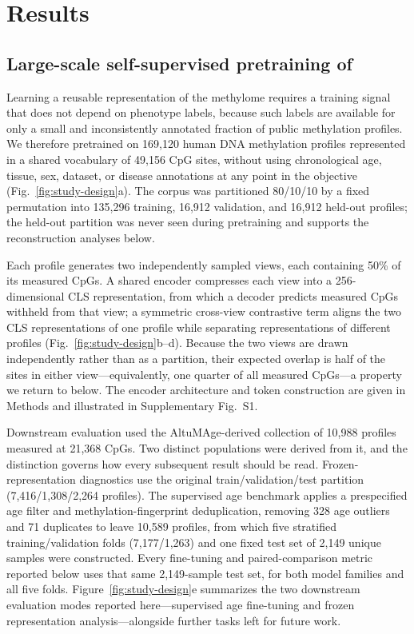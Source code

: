 \section{Results}

\subsection{Large-scale self-supervised pretraining of \method{}}

Learning a reusable representation of the methylome requires a training signal that does not
depend on phenotype labels, because such labels are available for only a small and
inconsistently annotated fraction of public methylation profiles. We therefore pretrained
\method{} on 169,120 human DNA methylation profiles represented in a shared vocabulary of
49,156 CpG sites, without using chronological age, tissue, sex, dataset, or disease
annotations at any point in the objective (Fig.~\ref{fig:study-design}a). The corpus was
partitioned 80/10/10 by a fixed
permutation into 135,296 training, 16,912 validation, and 16,912 held-out profiles; the
held-out partition was never seen during pretraining and supports the reconstruction analyses
below.

Each profile generates two independently sampled views, each containing 50\% of its measured
CpGs. A shared encoder compresses each view into a 256-dimensional CLS representation, from
which a decoder predicts measured CpGs withheld from that view; a symmetric cross-view
contrastive term aligns the two CLS representations of one profile while separating
representations of different profiles (Fig.~\ref{fig:study-design}b--d). Because the two views are
drawn independently rather than as a partition, their expected overlap is half of the sites in
either view---equivalently, one quarter of all measured CpGs---a property we return to below.
The encoder architecture and token construction
are given in Methods and illustrated in Supplementary Fig.~S1.

Downstream evaluation used the AltuMAge-derived collection of 10,988 profiles measured at
21,368 CpGs. Two distinct populations were derived from it, and the distinction governs how
every subsequent result should be read. Frozen-representation diagnostics use the original
train/validation/test partition (7,416/1,308/2,264 profiles). The supervised age benchmark
applies a prespecified age filter and methylation-fingerprint deduplication, removing 328 age
outliers and 71 duplicates to leave 10,589 profiles, from which five stratified
training/validation folds (7,177/1,263) and one fixed test set of 2,149 unique samples were
constructed. Every fine-tuning and paired-comparison metric reported below uses that same
2,149-sample test set, for both model families and all five folds. Figure~\ref{fig:study-design}e
summarizes the two downstream evaluation modes reported here---supervised age fine-tuning and
frozen representation analysis---alongside further tasks left for future work.

